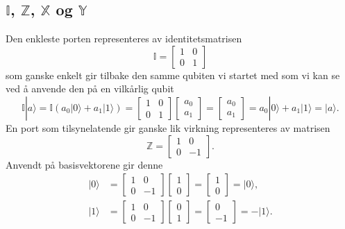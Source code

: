 \subsection{$\mathbb{I}$, $\mathbb{Z}$, $\mathbb{X}$ og $\mathbb{Y}$} 
Den enkleste porten representeres av identitetsmatrisen
\begin{displaymath}
	\mathbb{I} = \left[\begin{array}{cc}1 & 0 \\ 0 & 1 \end{array}\right]
\end{displaymath}
som ganske enkelt gir tilbake den samme qubiten vi startet med som vi kan se ved å anvende den på en vilkårlig qubit
\begin{displaymath}
	\mathbb{I}|a\rangle = \mathbb{I}(a_0|0\rangle + a_1|1\rangle)= \left[\begin{array}{cc}1 & 0 \\ 0 & 1 \end{array}\right]\left[\begin{array}{c} a_0 \\ a_1\end{array}\right] 
	= \left[\begin{array}{c} a_0 \\ a_1\end{array}\right] = a_0|0\rangle + a_1|1\rangle =  |a\rangle.
\end{displaymath}
En port som tilsynelatende gir ganske lik virkning representeres av matrisen
\begin{displaymath}
	\mathbb{Z} = \left[\begin{array}{cc}1 & 0 \\ 0 & -1 \end{array}\right].
\end{displaymath}
Anvendt på basisvektorene gir denne
\begin{align*}
	\mathbb|0\rangle &=  \left[\begin{array}{cc}1 & 0 \\ 0 & -1 \end{array}\right] \left[\begin{array}{c} 1 \\ 0 \end{array}\right]
	 =  \left[\begin{array}{c} 1 \\ 0 \end{array}\right] = |0\rangle, \\
	\mathbb|1\rangle &=  \left[\begin{array}{cc}1 & 0 \\ 0 & -1 \end{array}\right] \left[\begin{array}{r} 0 \\ 1 \end{array}\right] 
	= \left[\begin{array}{r} 0 \\ -1 \end{array}\right] = -|1\rangle.
\end{align*}
